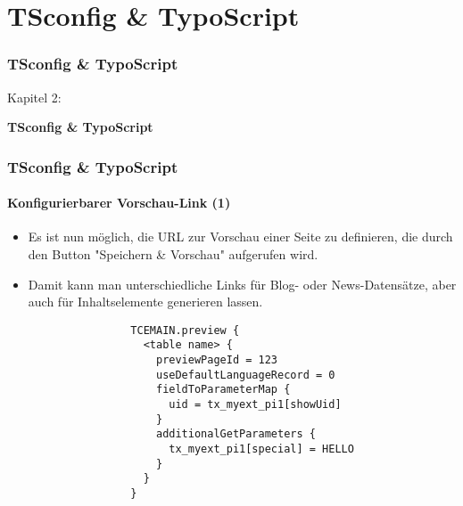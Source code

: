 %

\section{TSconfig \& TypoScript}
\begin{frame}[fragile]
	\frametitle{TSconfig \& TypoScript}

	\begin{center}\huge{Kapitel 2:}\end{center}
	\begin{center}\huge{\color{typo3darkgrey}\textbf{TSconfig \& TypoScript}}\end{center}

\end{frame}

\begin{frame}[fragile]
	\frametitle{TSconfig \& TypoScript}
	\framesubtitle{Konfigurierbarer Vorschau-Link (1)}

	\lstset{basicstyle=\tiny\ttfamily}

	\begin{itemize}
		\item Es ist nun möglich, die URL zur Vorschau einer Seite zu definieren,
			die durch den Button "Speichern \& Vorschau" aufgerufen wird.

		\item Damit kann man unterschiedliche Links für Blog- oder News-Datensätze,
			aber auch für Inhaltselemente generieren lassen.

			\begin{lstlisting}
				TCEMAIN.preview {
				  <table name> {
				    previewPageId = 123
				    useDefaultLanguageRecord = 0
				    fieldToParameterMap {
				      uid = tx_myext_pi1[showUid]
				    }
				    additionalGetParameters {
				      tx_myext_pi1[special] = HELLO
				    }
				  }
				}
			\end{lstlisting}

	\end{itemize}

\end{frame}

